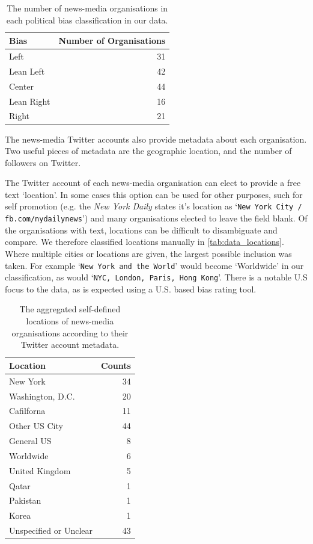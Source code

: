 \begin{table}[!htbp]
	\centering
	\begin{tabular}{lr}
		\toprule
		Bias &   Number of Organisations \\
		\midrule
		{\color{Left} Left }&  31 \\
		{\color{LeanLeft} Lean Left }&  42 \\
		{\color{Center} Center }&  44 \\
		{\color{LeanRight} Lean Right }&  16 \\
		{\color{Right} Right }&  21 \\
		\bottomrule
	\end{tabular}
	\caption{The number of news-media organisations in each political bias classification in our data.}
	\label{fig:data_number_of_bias_organisations}
\end{table}

The news-media Twitter accounts also provide metadata about each organisation. Two useful pieces of metadata are the geographic location, and the number of followers on Twitter.

The Twitter account of each news-media organisation can elect to provide a free text `location'. In some cases this option can be used for other purposes, such for self promotion (e.g. the \emph{New York Daily} states it's location as `\texttt{New York City  /  fb.com/nydailynews}') and many organisations elected to leave the field blank. 
Of the organisations with text, locations can be difficult to disambiguate and compare. We therefore classified locations manually in \autoref{tab:data_locations}. Where multiple cities or locations are given, the largest possible inclusion was taken. For example `\texttt{New York and the World}' would become `Worldwide' in our classification, as would `\texttt{NYC, London, Paris, Hong Kong}'. There is a notable U.S focus to the data, as is expected using a U.S. based bias rating tool.

\begin{table}[!htbp]
	\centering
	\begin{tabular}{lr}
		\toprule
		Location &  Counts \\
		\midrule
		New York &      34 \\
		Washington, D.C. &      20 \\
		Cafilforna &      11 \\
		Other US City &      44 \\
		General US &       8 \\
		Worldwide &       6 \\
		United Kingdom &       5 \\
		Qatar &       1 \\
		Pakistan &       1 \\
		Korea  &       1 \\
		Unspecified or Unclear &      43 \\
		\bottomrule
	\end{tabular}
	\caption{The aggregated self-defined locations of news-media organisations according to their Twitter account metadata. }
	\label{tab:data_locations}
\end{table}


